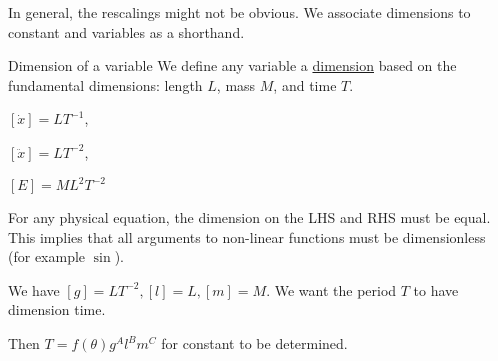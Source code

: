 \documentclass[../Main.tex]{subfiles}
\begin{document}
In general, the rescalings might not be obvious. We associate dimensions to constant and variables as a shorthand.\par
\begin{definition}{Dimension of a variable}
    We define any variable a \underline{dimension} based on the fundamental dimensions: length $L$, mass $M$, and time $T$.
\end{definition}
\begin{examples}{}
    \item $[\dot{x}] = LT^{-1}$,
    \item $[\ddot{x}] = LT^{-2}$,
    \item $[E] = ML^2 T^{-2}$
\end{examples}
For any physical equation, the dimension on the LHS and RHS must be equal. This implies that all arguments to non-linear functions must be dimensionless (for example $\sin$).
\begin{example}
    We have $[g] = LT^{-2}, [l] = L, [m] = M$. We want the period $T$ to have dimension time.\par
    Then $T = f(\theta) g^A l^B m^C$ for constant to be determined.
\end{example}
\end{document}
